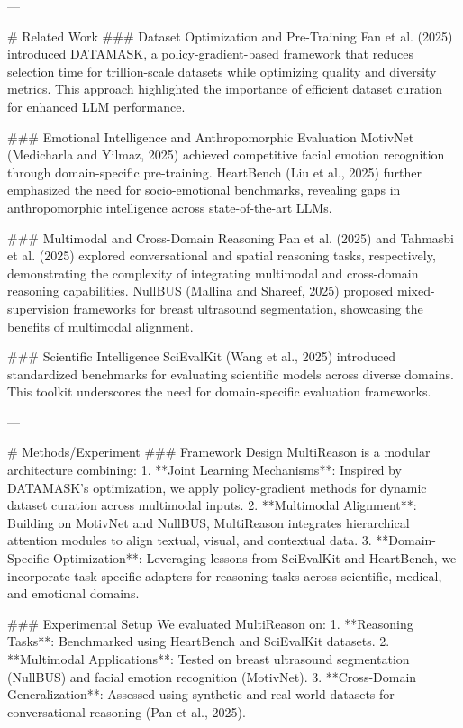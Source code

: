 ---

# Related Work  
### Dataset Optimization and Pre-Training
Fan et al. (2025) introduced DATAMASK, a policy-gradient-based framework that reduces selection time for trillion-scale datasets while optimizing quality and diversity metrics. This approach highlighted the importance of efficient dataset curation for enhanced LLM performance.

### Emotional Intelligence and Anthropomorphic Evaluation  
MotivNet (Medicharla and Yilmaz, 2025) achieved competitive facial emotion recognition through domain-specific pre-training. HeartBench (Liu et al., 2025) further emphasized the need for socio-emotional benchmarks, revealing gaps in anthropomorphic intelligence across state-of-the-art LLMs.

### Multimodal and Cross-Domain Reasoning  
Pan et al. (2025) and Tahmasbi et al. (2025) explored conversational and spatial reasoning tasks, respectively, demonstrating the complexity of integrating multimodal and cross-domain reasoning capabilities. NullBUS (Mallina and Shareef, 2025) proposed mixed-supervision frameworks for breast ultrasound segmentation, showcasing the benefits of multimodal alignment.

### Scientific Intelligence  
SciEvalKit (Wang et al., 2025) introduced standardized benchmarks for evaluating scientific models across diverse domains. This toolkit underscores the need for domain-specific evaluation frameworks.

---

# Methods/Experiment  
### Framework Design  
MultiReason is a modular architecture combining:  
1. **Joint Learning Mechanisms**: Inspired by DATAMASK's optimization, we apply policy-gradient methods for dynamic dataset curation across multimodal inputs.  
2. **Multimodal Alignment**: Building on MotivNet and NullBUS, MultiReason integrates hierarchical attention modules to align textual, visual, and contextual data.  
3. **Domain-Specific Optimization**: Leveraging lessons from SciEvalKit and HeartBench, we incorporate task-specific adapters for reasoning tasks across scientific, medical, and emotional domains.

### Experimental Setup  
We evaluated MultiReason on:  
1. **Reasoning Tasks**: Benchmarked using HeartBench and SciEvalKit datasets.  
2. **Multimodal Applications**: Tested on breast ultrasound segmentation (NullBUS) and facial emotion recognition (MotivNet).  
3. **Cross-Domain Generalization**: Assessed using synthetic and real-world datasets for conversational reasoning (Pan et al., 2025).

